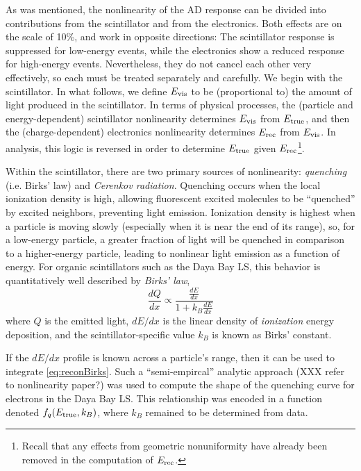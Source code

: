 \documentclass[../thesis.tex]{subfiles}
\begin{document}
As was mentioned, the nonlinearity of the AD response can be divided into
contributions from the scintillator and from the electronics. Both effects are
on the scale of 10\%, and work in opposite directions: The scintillator response
is suppressed for low-energy events, while the electronics show a reduced
response for high-energy events. Nevertheless, they do not cancel each other
very effectively, so each must be treated separately and carefully. We begin
with the scintillator. In what follows, we define $E_\mathrm{vis}$ to be (proportional
to) the amount of light produced in the scintillator. In terms of physical
processes, the (particle and energy-dependent) scintillator nonlinearity
determines $E_\mathrm{vis}$ from $E_\mathrm{true}$, and then the (charge-dependent) electronics
nonlinearity determines $E_\mathrm{rec}$ from $E_\mathrm{vis}$. In analysis, this logic is
reversed in order to determine $E_\mathrm{true}$ given $E_\mathrm{rec}$\footnote{Recall that any
  effects from geometric nonuniformity have already been removed in the
  computation of $E_\mathrm{rec}$.}.

Within the scintillator, there are two primary sources of nonlinearity:
\emph{quenching} (i.e. Birks' law) and \emph{Cerenkov radiation}. Quenching
occurs when the local ionization density is high, allowing fluorescent excited
molecules to be ``quenched'' by excited neighbors, preventing light
emission. Ionization density is highest when a particle is moving slowly
(especially when it is near the end of its range), so, for a low-energy
particle, a greater fraction of light will be quenched in comparison to a
higher-energy particle, leading to nonlinear light emission as a function of
energy. For organic scintillators such as the Daya Bay LS, this behavior is
quantitatively well described by \emph{Birks' law},
\begin{equation}
  \frac{dQ}{dx} \propto \frac{\frac{dE}{dx}}{1 + k_B \frac{dE}{dx}}
  \label{eq:reconBirks}
\end{equation}
where $Q$ is the emitted light, $dE/dx$ is the linear density of
\emph{ionization} energy deposition, and the scintillator-specific value $k_B$
is known as Birks' constant.

If the $dE/dx$ profile is known across a particle's range, then it can be used
to integrate \eqref{eq:reconBirks}. Such a ``semi-empircal'' analytic approach
(XXX refer to nonlinearity paper?) was used to compute the shape of the
quenching curve for electrons in the Daya Bay LS. This relationship was encoded
in a function denoted $f_q(E_\mathrm{true}, k_B)$, where $k_B$ remained to be determined
from data.
\end{document}
